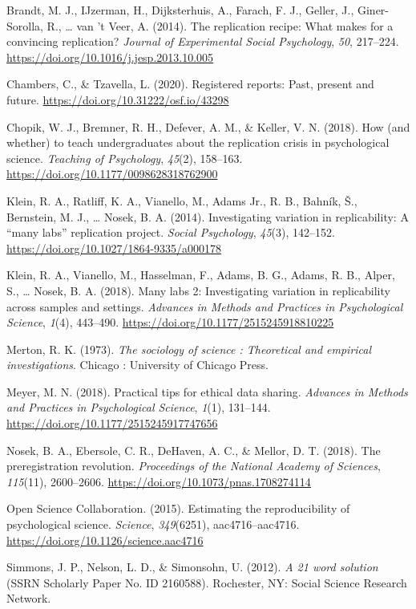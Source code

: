 \documentclass[
  english,
  man,mask,floatsintext]{apa6}
\begin{document}
\hypertarget{refs}{}
\leavevmode\hypertarget{ref-brandtReplicationRecipeWhat2014}{}%
Brandt, M. J., IJzerman, H., Dijksterhuis, A., Farach, F. J., Geller, J., Giner-Sorolla, R., \ldots{} van 't Veer, A. (2014). The replication recipe: What makes for a convincing replication? \emph{Journal of Experimental Social Psychology}, \emph{50}, 217--224. \url{https://doi.org/10.1016/j.jesp.2013.10.005}

\leavevmode\hypertarget{ref-chambersRegisteredReportsPresent2020}{}%
Chambers, C., \& Tzavella, L. (2020). Registered reports: Past, present and future. \url{https://doi.org/10.31222/osf.io/43298}

\leavevmode\hypertarget{ref-chopikHowWhetherTeach2018}{}%
Chopik, W. J., Bremner, R. H., Defever, A. M., \& Keller, V. N. (2018). How (and whether) to teach undergraduates about the replication crisis in psychological science. \emph{Teaching of Psychology}, \emph{45}(2), 158--163. \url{https://doi.org/10.1177/0098628318762900}

\leavevmode\hypertarget{ref-kleinInvestigatingVariationReplicability2014}{}%
Klein, R. A., Ratliff, K. A., Vianello, M., Adams Jr., R. B., Bahník, Š., Bernstein, M. J., \ldots{} Nosek, B. A. (2014). Investigating variation in replicability: A ``many labs'' replication project. \emph{Social Psychology}, \emph{45}(3), 142--152. \url{https://doi.org/10.1027/1864-9335/a000178}

\leavevmode\hypertarget{ref-kleinManyLabsInvestigating2018}{}%
Klein, R. A., Vianello, M., Hasselman, F., Adams, B. G., Adams, R. B., Alper, S., \ldots{} Nosek, B. A. (2018). Many labs 2: Investigating variation in replicability across samples and settings. \emph{Advances in Methods and Practices in Psychological Science}, \emph{1}(4), 443--490. \url{https://doi.org/10.1177/2515245918810225}

\leavevmode\hypertarget{ref-mertonSociologyScienceTheoretical1973}{}%
Merton, R. K. (1973). \emph{The sociology of science : Theoretical and empirical investigations}. Chicago : University of Chicago Press.

\leavevmode\hypertarget{ref-meyerPracticalTipsEthical2018}{}%
Meyer, M. N. (2018). Practical tips for ethical data sharing. \emph{Advances in Methods and Practices in Psychological Science}, \emph{1}(1), 131--144. \url{https://doi.org/10.1177/2515245917747656}

\leavevmode\hypertarget{ref-nosekPreregistrationRevolution2018}{}%
Nosek, B. A., Ebersole, C. R., DeHaven, A. C., \& Mellor, D. T. (2018). The preregistration revolution. \emph{Proceedings of the National Academy of Sciences}, \emph{115}(11), 2600--2606. \url{https://doi.org/10.1073/pnas.1708274114}

\leavevmode\hypertarget{ref-opensciencecollaborationEstimatingReproducibilityPsychological2015}{}%
Open Science Collaboration. (2015). Estimating the reproducibility of psychological science. \emph{Science}, \emph{349}(6251), aac4716--aac4716. \url{https://doi.org/10.1126/science.aac4716}

\leavevmode\hypertarget{ref-simmons21WordSolution2012}{}%
Simmons, J. P., Nelson, L. D., \& Simonsohn, U. (2012). \emph{A 21 word solution} (SSRN Scholarly Paper No. ID 2160588). Rochester, NY: Social Science Research Network.

\endgroup
\end{document}
